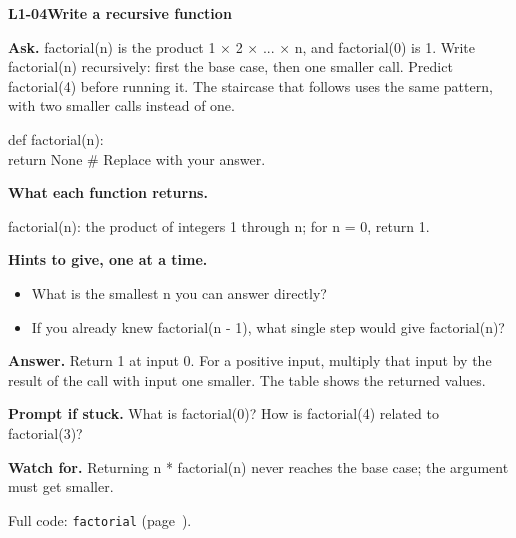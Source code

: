 \documentclass[11pt,a4paper]{article}
\begin{document}
\noindent\begin{minipage}{\textwidth}
{\color{teal}\textbf{L1-04}}\quad \textbf{Write a recursive function}\par\smallskip
\textbf{Ask.} factorial(n) is the product 1 × 2 × ... × n, and factorial(0) is 1. Write factorial(n) recursively: first the base case, then one smaller call. Predict factorial(4) before running it. The staircase that follows uses the same pattern, with two smaller calls instead of one.\par\smallskip
\par{}\par\smallskip\noindent\colorbox{codepaper}{\parbox{\dimexpr\linewidth-2\fboxsep\relax}{\small\ttfamily\raggedright def factorial(n):\\\hspace*{2.4em}return None  \# Replace with your answer.}}\par
{\small\textbf{What each function returns.}\par factorial(n): the product of integers 1 through n; for n = 0, return 1.\par }
{\small\textbf{Hints to give, one at a time.}}\begin{itemize}\item What is the smallest n you can answer directly?\item If you already knew factorial(n - 1), what single step would give factorial(n)?\end{itemize}
\textbf{Answer.} Return 1 at input 0. For a positive input, multiply that input by the result of the call with input one smaller. The table shows the returned values.\par\smallskip
\textbf{Prompt if stuck.} What is factorial(0)? How is factorial(4) related to factorial(3)?\par\smallskip
\textbf{Watch for.} Returning n * factorial(n) never reaches the base case; the argument must get smaller.\par\smallskip Full code: \texttt{factorial} (page~\pageref{L1-code-factorial}).
\end{minipage}\par{}\medskip
\end{document}
